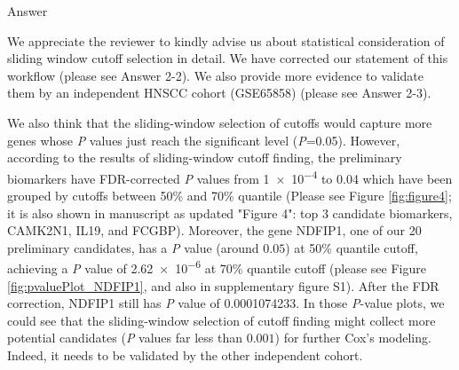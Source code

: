 \documentclass[preprint,12pt]{elsarticle}
\newenvironment{MyColorPar}[1]{%
    \leavevmode\color{#1}\ignorespaces%
}{%
}%
\begin{document}
%
\begin{MyColorPar}{blue}
Answer

We appreciate the reviewer to kindly advise us about statistical consideration of sliding window cutoff selection in detail.
We have corrected our statement of this workflow (please see Answer 2-2).
We also provide more evidence to validate them by an independent HNSCC cohort (GSE65858) (please see Answer 2-3).

We also think that the sliding-window selection of cutoffs would capture more genes whose \textit{P} values just reach the significant level (\textit{P}=0.05).
However, according to the results of sliding-window cutoff finding, the preliminary biomarkers have FDR-corrected \textit{P} values from \num{1e-4} to 0.04 which have been grouped by cutoffs between 50\% and 70\% quantile (Please see Figure \ref{fig:figure4}; it is also shown in manuscript as updated "Figure 4": top 3 candidate biomarkers, CAMK2N1, IL19, and FCGBP).
Moreover, the gene NDFIP1, one of our 20 preliminary candidates, has a \textit{P} value (around $0.05$) at 50\% quantile cutoff, achieving a \textit{P} value of \num{2.62e-6} at 70\% quantile cutoff (please see Figure \ref{fig:pvaluePlot_NDFIP1}, and also in 
supplementary figure S1). After the FDR correction, NDFIP1 still has \textit{P} value of \num[round-precision=3, round-mode=figures,
scientific-notation=true]{0.0001074233}.
In those \textit{P}-value plots, we could see that the sliding-window selection of cutoff finding might collect more potential candidates (\textit{P} values far less than $0.001$) for further Cox's modeling.
Indeed, it needs to be validated by the other independent cohort.



\end{MyColorPar}
\end{document}
